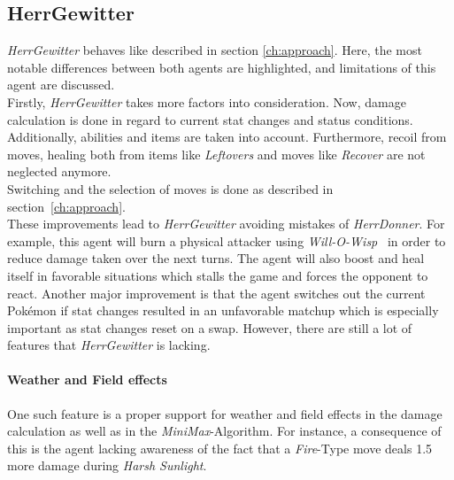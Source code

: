 \subsection{HerrGewitter}
\label{sec:HerrGewitter}
\textit{HerrGewitter} behaves like described in section \ref{ch:approach}. Here, the most notable
differences between both agents are highlighted, and limitations of this agent are discussed. \\
Firstly, \textit{HerrGewitter} takes more factors into consideration. Now, damage calculation is done
in regard to current stat changes and status conditions. Additionally, abilities and items are taken 
into account. Furthermore, recoil from moves, healing both from items
like \textit{Leftovers} and moves like \textit{Recover} are not neglected
anymore. \\
Switching and the selection of moves is done as described in section~\ref{ch:approach}. \\
These improvements lead to \textit{HerrGewitter} avoiding mistakes of \textit{HerrDonner}. For example,
this agent will burn a physical attacker using \textit{Will-O-Wisp}~\autocite{Bulbapedia:WillOWisp}
in order to reduce damage taken over the next turns. The agent will also boost and heal itself in favorable
situations which stalls the game and forces the opponent to react. Another major improvement is that the
agent switches out the current Pokémon if stat changes resulted in an unfavorable matchup which is especially
important as stat changes reset on a swap. However, there are still a lot of features that \textit{HerrGewitter} 
is lacking. 

\paragraph{Weather and Field effects}
One such feature is a proper support for weather and field effects in the damage calculation as well
as in the \textit{MiniMax}-Algorithm. For instance, a consequence of this is the agent lacking awareness
of the fact that a \textit{Fire}-Type move deals 1.5 more damage during \textit{Harsh Sunlight}.

